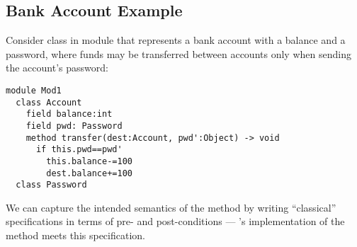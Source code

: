  
 

\subsection{Bank Account Example}
\label{s:bank}
  
Consider  class in module 
that represents a bank account
with a balance and a password, where funds may be transferred
between accounts only when sending the account's password:
%
%
%
%
% 
\begin{lstlisting}[language=Chainmail, frame=lines]
module Mod1
  class Account
    field balance:int 
    field pwd: Password
    method transfer(dest:Account, pwd':Object) -> void
      if this.pwd==pwd'
        this.balance-=100
        dest.balance+=100
  class Password
\end{lstlisting}
%
\noindent 
We can capture the intended
semantics of the  method by writing ``classical''
specifications in terms of pre- and post-conditions ---
's implementation of the  method meets
this specification.



